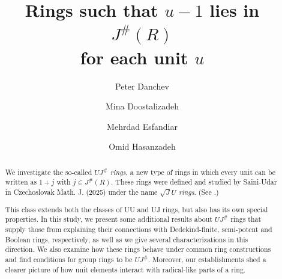 \documentclass[12pt]{amsart}
\theoremstyle{definition}
\begin{document}
	
\author[P. Danchev]{Peter Danchev}
\address{Institute of Mathematics and Informatics, Bulgarian Academy of Sciences, 1113 Sofia, Bulgaria}

\author[M. Doostalizadeh]{Mina Doostalizadeh}
\address{Department of Mathematics, Tarbiat Modares University, 14115-111 Tehran Jalal AleAhmad Nasr, Iran}

\author[M. Esfandiar]{Mehrdad Esfandiar}
\address{Department of Mathematics and Computer Science Shahed University Tehran, Iran}

\author[O. Hasanzadeh]{Omid Hasanzadeh}
\address{Department of Mathematics, Tarbiat Modares University, 14115-111 Tehran Jalal AleAhmad Nasr, Iran}

\title[Rings such that $u-1$ lies in $J^{\#}(R)$ for each unit $u$]{{\small Rings such that} \large$u-1$ {\small lies in $J^{\#}(R)$ \\ for each unit} \large$u$}

\maketitle




\begin{abstract}
We investigate the so-called {\it $UJ^{\#}$ rings}, a new type of rings in which every unit can be written as $1+j$ with $j\in J^{\#}(R)$. These rings were defined and studied by Saini-Udar in Czechoslovak Math. J. (2025) under the name {\it $\sqrt{J}U$ rings}. (See \cite{SU}.)

This class extends both the classes of UU and UJ rings, but also has its own special properties. In this study, we present some additional results about $UJ^{\#}$ rings that supply those from \cite{SU} explaining their connections with Dedekind-finite, semi-potent and Boolean rings, respectively, as well as we give several characterizations in this direction. We also examine how these rings behave under common ring constructions and find conditions for group rings to be $UJ^{\#}$. Moreover, our establishments shed a clearer picture of how unit elements interact with radical-like parts of a ring.
\end{abstract}
\end{document}
